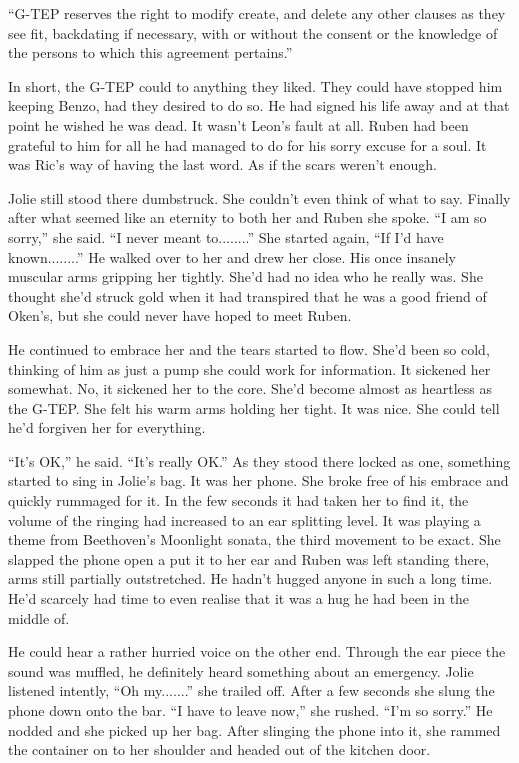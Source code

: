 ``G-TEP reserves the right to modify create, and delete any other clauses as they see fit, backdating if necessary, with or without the consent or the knowledge of the persons to which this agreement pertains.''



In short, the G-TEP could to anything they liked.  They could have stopped him keeping Benzo, had they desired to do so.  He had signed his life away and at that point he wished he was dead.  It wasn't Leon's fault at all.  Ruben had been grateful to him for all he had managed to do for his sorry excuse for a soul.  It was Ric's way of having the last word.  As if the scars weren't enough.  



\thoughtbreak



Jolie still stood there dumbstruck.  She couldn't even think of what to say.  Finally after what seemed like an eternity to both her and Ruben she spoke.  ``I am so sorry,'' she said.  ``I never meant to........''  She started again, ``If I'd have known........''  He walked over to her and drew her close.  His once insanely muscular arms gripping her tightly.  She'd had no idea who he really was.  She thought she'd struck gold when it had transpired that he was a good friend of Oken's, but she could never have hoped to meet Ruben.

He continued to embrace her and the tears started to flow.  She'd been so cold, thinking of him as just a pump she could work for information.  It sickened her somewhat.  No, it sickened her to the core.  She'd become almost as heartless as the G-TEP.  She felt his warm arms holding her tight.  It was nice.  She could tell he'd forgiven her for everything.  

``It's OK,'' he said.  ``It's really OK.''  As they stood there locked as one, something started to sing in Jolie's bag.  It was her phone.  She broke free of his embrace and quickly rummaged for it.  In the few seconds it had taken her to find it, the volume of the ringing had increased to an ear splitting level.  It was playing a theme from Beethoven's Moonlight sonata, the third movement to be exact.  She slapped the phone open a put it to her ear and Ruben was left standing there, arms still partially outstretched.  He hadn't hugged anyone in such a long time.  He'd scarcely had time to even realise that it was a hug he had been in the middle of.

He could hear a rather hurried voice on the other end.  Through the ear piece the sound was muffled, he definitely heard something about an emergency.  Jolie listened intently, ``Oh my.......'' she trailed off.  After a few seconds she slung the phone down onto the bar.  ``I have to leave now,'' she rushed.  ``I'm so sorry.''  He nodded and she picked up her bag.  After slinging the phone into it, she rammed the container on to her shoulder and headed out of the kitchen door.

